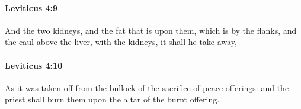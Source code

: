 		\paragraph{Leviticus 4:9} %
			\label{LEVITICUS-4-9}

			And the two kidneys, and the fat that is upon them, which is by the flanks, and the caul above the liver, with the kidneys, it shall he take away,


		\paragraph{Leviticus 4:10} %
			\label{LEVITICUS-4-10}

			As it was taken off from the bullock of the sacrifice of peace offerings: and the priest shall burn them upon the altar of the burnt offering.


